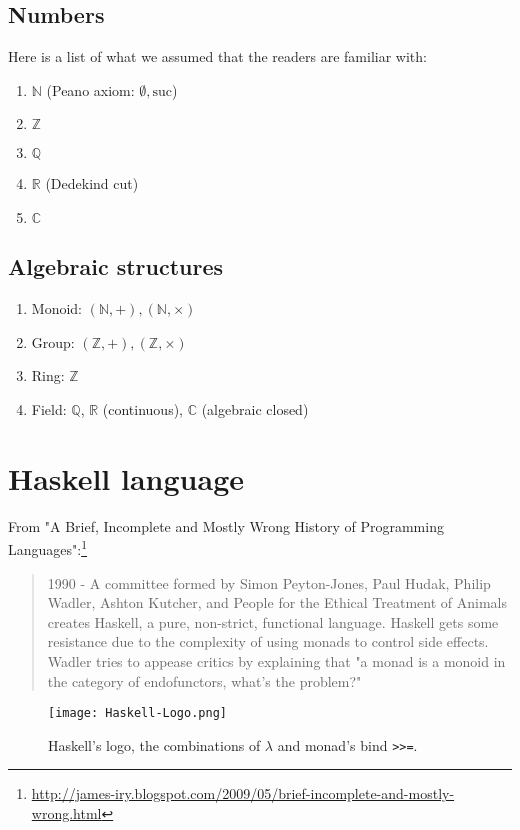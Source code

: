 \documentclass[11pt]{book}
\begin{document}
\subsection{Numbers}
Here is a list of what we assumed that the readers are familiar with:
\begin{enumerate}
\item $\mathbb{N}$ (Peano axiom: $\emptyset, \text{suc}$)
\item $\mathbb{Z}$
\item $\mathbb{Q}$
\item $\mathbb{R}$ (Dedekind cut)
\item $\mathbb{C}$ 
\end{enumerate}

\subsection{Algebraic structures}
\begin{enumerate}
\item Monoid: $(\mathbb{N},+), (\mathbb{N},\times)$
\item Group: $(\mathbb{Z},+), (\mathbb{Z},\times)$
\item Ring: $\mathbb{Z}$
\item Field: $\mathbb{Q}$, $\mathbb{R}$ (continuous), $\mathbb{C}$ (algebraic closed)
\end{enumerate}

\section{Haskell language}
From "A Brief, Incomplete and Mostly Wrong History of Programming Languages":\footnote{
\url{http://james-iry.blogspot.com/2009/05/brief-incomplete-and-mostly-wrong.html}
}
\begin{quotation}
1990 - A committee formed by Simon Peyton-Jones, Paul Hudak, Philip Wadler, Ashton Kutcher, and People for the Ethical Treatment of Animals creates Haskell, a pure, non-strict, functional language. Haskell gets some resistance due to the complexity of using monads to control side effects. Wadler tries to appease critics by explaining that "a monad is a monoid in the category of endofunctors, what's the problem?" 
\end{quotation}

\begin{figure}[h]
\begin{center}
\texttt{[image: Haskell-Logo.png]}
\caption{Haskell's logo, the combinations of $\lambda$ and monad's bind \texttt{>>=}.}
\label{Haskell-Logo}
\end{center}
\end{figure}
\end{document}
